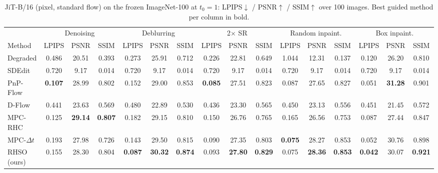 \begin{table}[t]
\centering
\small
\setlength{\tabcolsep}{3.5pt}
\caption{JiT-B/16 (pixel, standard flow) on the frozen ImageNet-100 at $t_0 = 1$: LPIPS$\downarrow$ / PSNR$\uparrow$ / SSIM$\uparrow$ over 100 images. Best guided method per column in bold.}
\label{tab:final_jit}
\begin{tabular}{lccccccccccccccc}
\toprule
 & \multicolumn{3}{c}{Denoising} & \multicolumn{3}{c}{Deblurring} & \multicolumn{3}{c}{2$\times$ SR} & \multicolumn{3}{c}{Random inpaint.} & \multicolumn{3}{c}{Box inpaint.} \\
\cmidrule(lr){2-4} \cmidrule(lr){5-7} \cmidrule(lr){8-10} \cmidrule(lr){11-13} \cmidrule(lr){14-16}
Method & LPIPS & PSNR & SSIM & LPIPS & PSNR & SSIM & LPIPS & PSNR & SSIM & LPIPS & PSNR & SSIM & LPIPS & PSNR & SSIM \\
\midrule
Degraded & 0.486 & 20.51 & 0.393 & 0.273 & 25.91 & 0.712 & 0.226 & 22.81 & 0.649 & 1.044 & 12.31 & 0.137 & 0.120 & 26.20 & 0.810 \\
\midrule
SDEdit & 0.720 & 9.17 & 0.014 & 0.720 & 9.17 & 0.014 & 0.720 & 9.17 & 0.014 & 0.720 & 9.17 & 0.014 & 0.720 & 9.17 & 0.014 \\
PnP-Flow & \textbf{0.107} & 28.99 & 0.802 & 0.152 & 29.00 & 0.853 & \textbf{0.085} & 27.51 & 0.823 & 0.087 & 27.65 & 0.827 & 0.051 & \textbf{31.28} & 0.901 \\
D-Flow & 0.441 & 23.63 & 0.569 & 0.480 & 22.89 & 0.530 & 0.436 & 23.30 & 0.565 & 0.450 & 23.13 & 0.556 & 0.451 & 21.45 & 0.572 \\
MPC-RHC & 0.125 & \textbf{29.14} & \textbf{0.807} & 0.182 & 29.15 & 0.810 & 0.150 & 26.76 & 0.765 & 0.165 & 26.56 & 0.753 & 0.087 & 27.44 & 0.847 \\
MPC-$\Delta t$ & 0.193 & 27.98 & 0.726 & 0.143 & 29.50 & 0.815 & 0.090 & 27.35 & 0.803 & \textbf{0.075} & 28.27 & 0.853 & 0.052 & 30.76 & 0.898 \\
RHSO (ours) & 0.155 & 28.30 & 0.804 & \textbf{0.087} & \textbf{30.32} & \textbf{0.874} & 0.093 & \textbf{27.80} & \textbf{0.829} & 0.075 & \textbf{28.36} & \textbf{0.853} & \textbf{0.042} & 30.07 & \textbf{0.921} \\
\bottomrule
\end{tabular}
\end{table}

